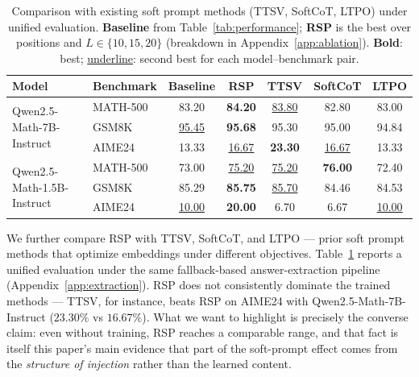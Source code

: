\begin{table}[!t]
\centering
\caption{Comparison with existing soft prompt methods (TTSV, SoftCoT, LTPO) under unified evaluation. \textbf{Baseline} from Table~\ref{tab:performance}; \textbf{RSP} is the best over positions and $L\in\{10,15,20\}$ (breakdown in Appendix~\ref{app:ablation}). \textbf{Bold}: best; \underline{underline}: second best for each model--benchmark pair.}
\label{tab:prior_comparison}
\footnotesize
\renewcommand{\arraystretch}{0.9}
\begin{tabular}{llccccc}
\toprule
\textbf{Model} & \textbf{Benchmark} & \textbf{Baseline} & \cellcolor{blue!10}\textbf{RSP} & \textbf{TTSV} & \textbf{SoftCoT} & \textbf{LTPO} \\
\midrule
\multirow{3}{*}{Qwen2.5-Math-7B-Instruct} & MATH-500 & 83.20 & \cellcolor{blue!10}\textbf{84.20} & \underline{83.80} & 82.80 & 83.00 \\
 & GSM8K   & \underline{95.45} & \cellcolor{blue!10}\textbf{95.68} & 95.30 & 95.00 & 94.84 \\
 & AIME24  & 13.33 & \cellcolor{blue!10}\underline{16.67} & \textbf{23.30} & \underline{16.67} & 13.33 \\
\midrule
\multirow{3}{*}{Qwen2.5-Math-1.5B-Instruct} & MATH-500 & 73.00 & \cellcolor{blue!10}\underline{75.20} & \underline{75.20} & \textbf{76.00} & 72.40 \\
 & GSM8K   & 85.29 & \cellcolor{blue!10}\textbf{85.75} & \underline{85.70} & 84.46 & 84.53 \\
 & AIME24  & \underline{10.00} & \cellcolor{blue!10}\textbf{20.00} &  6.70 &  6.67 & \underline{10.00} \\
\bottomrule
\end{tabular}
\end{table}

We further compare RSP with TTSV, SoftCoT, and LTPO --- prior soft prompt methods that optimize embeddings under different objectives. Table~\ref{tab:prior_comparison} reports a unified evaluation under the same fallback-based answer-extraction pipeline (Appendix~\ref{app:extraction}). RSP does not consistently dominate the trained methods --- TTSV, for instance, beats RSP on AIME24 with Qwen2.5-Math-7B-Instruct ($23.30\%$ vs $16.67\%$). What we want to highlight is precisely the converse claim: even without training, RSP reaches a comparable range, and that fact is itself this paper's main evidence that part of the soft-prompt effect comes from the \emph{structure of injection} rather than the learned content.


